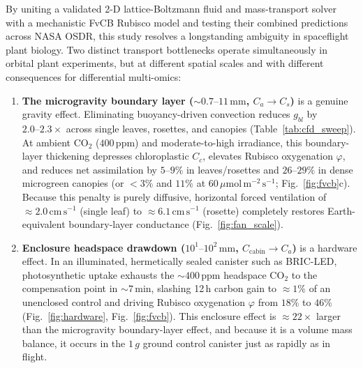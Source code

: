 \documentclass[preprint,11pt,numbers,sort&compress]{elsarticle}
\newcommand{\ums}{\ensuremath{\mu\mathrm{mol\,m^{-2}\,s^{-1}}}}
\newcommand{\cmsu}{\ensuremath{\mathrm{cm\,s^{-1}}}}
\begin{document}
By uniting a validated 2-D lattice-Boltzmann fluid and mass-transport solver with a mechanistic FvCB Rubisco model and testing their combined predictions across NASA OSDR, this study resolves a longstanding ambiguity in spaceflight plant biology. Two distinct transport bottlenecks operate simultaneously in orbital plant experiments, but at different spatial scales and with different consequences for differential multi-omics:
\begin{enumerate}
    \item \textbf{The microgravity boundary layer ($\sim 0.7\text{--}11\,\mathrm{mm}$, $C_a \to C_s$)} is a genuine gravity effect. Eliminating buoyancy-driven convection reduces $g_{bl}$ by $2.0\text{--}2.3\times$ across single leaves, rosettes, and canopies (Table~\ref{tab:cfd_sweep}). At ambient $\mathrm{CO_2}$ ($400\,\mathrm{ppm}$) and moderate-to-high irradiance, this boundary-layer thickening depresses chloroplastic $C_c$, elevates Rubisco oxygenation $\varphi$, and reduces net assimilation by $5\text{--}9\%$ in leaves/rosettes and $26\text{--}29\%$ in dense microgreen canopies (or $<3\%$ and $11\%$ at $60\,\ums$; Fig.~\ref{fig:fvcb}c). Because this penalty is purely diffusive, horizontal forced ventilation of $\approx 2.0\,\cmsu$ (single leaf) to $\approx 6.1\,\cmsu$ (rosette) completely restores Earth-equivalent boundary-layer conductance (Fig.~\ref{fig:fan_scale}).
    \item \textbf{Enclosure headspace drawdown ($10^1\text{--}10^2\,\mathrm{mm}$, $C_{\text{cabin}} \to C_a$)} is a hardware effect. In an illuminated, hermetically sealed canister such as BRIC-LED, photosynthetic uptake exhausts the $\sim 400\,\mathrm{ppm}$ headspace $\mathrm{CO_2}$ to the compensation point in $\sim 7\,\mathrm{min}$, slashing 12\,h carbon gain to $\approx 1\%$ of an unenclosed control and driving Rubisco oxygenation $\varphi$ from $18\%$ to $46\%$ (Fig.~\ref{fig:hardware}, Fig.~\ref{fig:fvcb}). This enclosure effect is $\approx 22\times$ larger than the microgravity boundary-layer effect, and because it is a volume mass balance, it occurs in the $1\,g$ ground control canister just as rapidly as in flight.
\end{enumerate}
\end{document}
